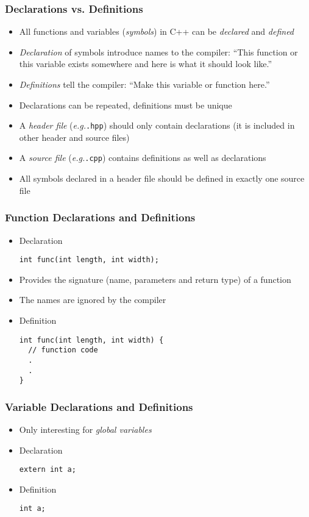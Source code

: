 \documentclass{slides}
\newcommand{\eg}{\textit{e.\thinspace g.}\xspace}
\begin{document}
\begin{frame}
  \frametitle{Declarations vs. Definitions}
  \begin{itemize}
  \item All functions and variables (\emph{symbols}) in C++ can be
    \emph{declared} and \emph{defined}
  \item \emph{Declaration} of symbols introduce names to the compiler:
    ``This function or this variable exists somewhere and here is what
    it should look like.''
  \item \emph{Definitions} tell the compiler: ``Make this variable
    or function here.''
  \item Declarations can be repeated, definitions must be unique
  \item A \emph{header file} (\eg \texttt{.hpp}) should only contain
    declarations (it is included in other header and source files)
  \item A \emph{source file} (\eg \texttt{.cpp}) contains definitions
    as well as declarations
  \item All symbols declared in a header file should be defined in
    exactly one source file
  \end{itemize}
\end{frame}

\begin{frame}[fragile]
  \frametitle{Function Declarations and Definitions}
  \begin{itemize}
  \item Declaration
    \begin{lstlisting}
int func(int length, int width);
    \end{lstlisting}
  \item Provides the signature (name, parameters and return type) of a
    function
  \item The names are ignored by the compiler
  \item Definition
    \begin{lstlisting}
int func(int length, int width) {
  // function code
  .
  .
}
    \end{lstlisting}
  \end{itemize}
\end{frame}

\begin{frame}[fragile]
  \frametitle{Variable Declarations and Definitions}
  \begin{itemize}
  \item Only interesting for \emph{global variables}
  \item Declaration
    \begin{lstlisting}
extern int a;
    \end{lstlisting}
  \item Definition
    \begin{lstlisting}
int a;
    \end{lstlisting}
  \end{itemize}
\end{frame}
\end{document}
